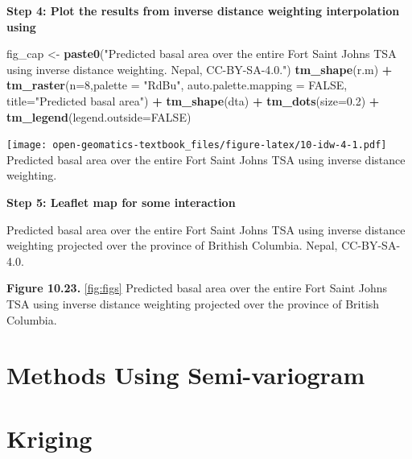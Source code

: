 \documentclass[
]{book}
\newenvironment{Shaded}{\begin{snugshade}}{\end{snugshade}}
\newcommand{\AttributeTok}[1]{\textcolor[rgb]{0.13,0.29,0.53}{#1}}
\newcommand{\ConstantTok}[1]{\textcolor[rgb]{0.56,0.35,0.01}{#1}}
\newcommand{\DecValTok}[1]{\textcolor[rgb]{0.00,0.00,0.81}{#1}}
\newcommand{\FloatTok}[1]{\textcolor[rgb]{0.00,0.00,0.81}{#1}}
\newcommand{\FunctionTok}[1]{\textcolor[rgb]{0.13,0.29,0.53}{\textbf{#1}}}
\newcommand{\NormalTok}[1]{#1}
\newcommand{\OtherTok}[1]{\textcolor[rgb]{0.56,0.35,0.01}{#1}}
\newcommand{\SpecialCharTok}[1]{\textcolor[rgb]{0.81,0.36,0.00}{\textbf{#1}}}
\newcommand{\StringTok}[1]{\textcolor[rgb]{0.31,0.60,0.02}{#1}}
\begin{document}
\textbf{Step 4: Plot the results from inverse distance weighting interpolation using}

\begin{Shaded}
\begin{Highlighting}[]
\NormalTok{fig\_cap }\OtherTok{\textless{}{-}} \FunctionTok{paste0}\NormalTok{(}\StringTok{"Predicted basal area over the entire Fort Saint Johns TSA using inverse distance weighting. Nepal, CC{-}BY{-}SA{-}4.0."}\NormalTok{)}
\FunctionTok{tm\_shape}\NormalTok{(r.m) }\SpecialCharTok{+} 
  \FunctionTok{tm\_raster}\NormalTok{(}\AttributeTok{n=}\DecValTok{8}\NormalTok{,}\AttributeTok{palette =} \StringTok{"RdBu"}\NormalTok{, }\AttributeTok{auto.palette.mapping =} \ConstantTok{FALSE}\NormalTok{,}
            \AttributeTok{title=}\StringTok{"Predicted basal area"}\NormalTok{) }\SpecialCharTok{+} 
  \FunctionTok{tm\_shape}\NormalTok{(dta) }\SpecialCharTok{+} \FunctionTok{tm\_dots}\NormalTok{(}\AttributeTok{size=}\FloatTok{0.2}\NormalTok{) }\SpecialCharTok{+}
  \FunctionTok{tm\_legend}\NormalTok{(}\AttributeTok{legend.outside=}\ConstantTok{FALSE}\NormalTok{)}
\end{Highlighting}
\end{Shaded}

\texttt{[image: open-geomatics-textbook\_files/figure-latex/10-idw-4-1.pdf]}
Predicted basal area over the entire Fort Saint Johns TSA using inverse distance weighting.

\textbf{Step 5: Leaflet map for some interaction}

\label{fig:10-idw-5}Predicted basal area over the entire Fort Saint Johns TSA using inverse distance weighting projected over the province of Brithish Columbia. Nepal, CC-BY-SA-4.0.

\textbf{Figure 10.23.} \ref{fig:figs} Predicted basal area over the entire Fort Saint Johns TSA using inverse distance weighting projected over the province of British Columbia.

\hypertarget{methods-using-semi-variogram}{%
\section{Methods Using Semi-variogram}\label{methods-using-semi-variogram}}

\hypertarget{kriging}{%
\section{Kriging}\label{kriging}}
\end{document}
